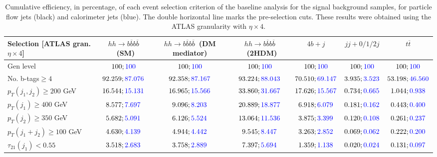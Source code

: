 \begin{landscape}
	\begin{table}
		\centering
		\caption{Cumulative efficiency, in percentage, of each event selection criterion of the baseline analysis for the signal background samples, for particle flow jets (black) and calorimeter jets (blue). The double horizontal line marks the pre-selection cuts. These results were obtained using the ATLAS granularity with $\eta\times 4$.}
		\begin{tabular}{lcccccc}
			\toprule 
			\textbf{Selection [ATLAS gran. $\eta\times 4$]} & $hh\rightarrow b\overline{b}b\overline{b}$~(SM) & $hh\rightarrow b\overline{b}b\overline{b}$~(DM mediator) & $hh\rightarrow b\overline{b}b\overline{b}$~(2HDM) & $4b+j$  & $jj+0/1/2 j$ & $t\overline{t}$ \\
			\midrule
			Gen level & $100;\textcolor{blue}{100}$ & $100;\textcolor{blue}{100}$ &$100;\textcolor{blue}{100}$& $100;\textcolor{blue}{100}$& $100;\textcolor{blue}{100}$& $100;\textcolor{blue}{100}$ \\
			\rowcolor{black!7}No. b-tags$\geq 4$&$92.259;\textcolor{blue}{87.076}$&$92.358;\textcolor{blue}{87.167}$&$93.224;\textcolor{blue}{88.043}$&$70.510;\textcolor{blue}{69.147}$&$3.935;\textcolor{blue}{3.523}$&$53.198;\textcolor{blue}{46.560}$\\
			$p_T(j_1,j_2)\geq200$ GeV & $16.544;\textcolor{blue}{15.131}$ & $16.965;\textcolor{blue}{15.566}$&$33.860;\textcolor{blue}{31.667}$ &$17.626;\textcolor{blue}{15.567}$&$0.734;\textcolor{blue}{0.665}$&$1.044;\textcolor{blue}{0.938}$\\
			\midrule \midrule
			\rowcolor{black!7}$p_T(j_1)\geq 400$ GeV & $8.577;\textcolor{blue}{7.697}$ &$9.096;\textcolor{blue}{8.203}$  &$20.889;\textcolor{blue}{18.877}$&$6.918;\textcolor{blue}{6.079}$&$0.181;\textcolor{blue}{0.162}$&$0.443;\textcolor{blue}{0.400}$\\ 
			$p_T(j_2)\geq 350$ GeV & $5.682;\textcolor{blue}{5.091}$& $6.126;\textcolor{blue}{5.524}$&$13.064;\textcolor{blue}{11.536}$&$3.875;\textcolor{blue}{3.399}$&$0.120;\textcolor{blue}{0.108}$&$0.261;\textcolor{blue}{0.237}$\\
			\rowcolor{black!7}$p_T(j_1+j_2)\geq 100$ GeV &$4.630;\textcolor{blue}{4.139}$ & $4.944;\textcolor{blue}{4.442}$ &$9.545;\textcolor{blue}{8.447}$&$3.263;\textcolor{blue}{2.852}$&$0.069;\textcolor{blue}{0.062}$&$0.222;\textcolor{blue}{0.200}$\\
			$\tau_{21}(j_1)<0.55$ & $3.518;\textcolor{blue}{2.683}$& $3.758;\textcolor{blue}{2.889}$&$7.397;\textcolor{blue}{5.694}$&$1.359;\textcolor{blue}{1.138}$&$0.020;\textcolor{blue}{0.024}$&$0.131;\textcolor{blue}{0.097}$\\

\end{tabular}
\end{table}
\end{landscape}
